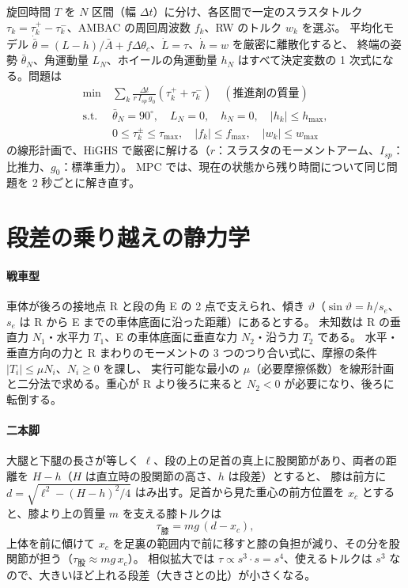 旋回時間 $T$ を $N$ 区間（幅 $\Delta t$）に分け、各区間で一定のスラスタトルク $\tau_k=\tau_k^+-\tau_k^-$、AMBAC の周回周波数 $f_k$、RW のトルク $w_k$ を選ぶ。
平均化モデル $\dot{\bar\theta} = (L-h)/\bar A + f\Delta\theta_c$、$\dot L=\tau$、$\dot h = w$ を厳密に離散化すると、
終端の姿勢 $\bar\theta_N$、角運動量 $L_N$、ホイールの角運動量 $h_N$ はすべて決定変数の 1 次式になる。問題は
\begin{align}
\min\ &\sum_k \frac{\Delta t}{r\,I_{sp}\,g_0}\left(\tau_k^++\tau_k^-\right) \quad(\text{推進剤の質量})\\
\text{s.t. }& \bar\theta_N = 90^\circ,\quad L_N=0,\quad h_N=0,\quad |h_k|\le h_{\max},\\
& 0\le\tau_k^\pm\le\tau_{\max},\quad |f_k|\le f_{\max},\quad |w_k|\le w_{\max}
\end{align}
の線形計画で、HiGHS \cite{R25} で厳密に解ける（$r$：スラスタのモーメントアーム、$I_{sp}$：比推力、$g_0$：標準重力）。
MPC では、現在の状態から残り時間について同じ問題を 2 秒ごとに解き直す。

\section{段差の乗り越えの静力学}\label{app:steps}

\paragraph{戦車型}
車体が後ろの接地点 R と段の角 E の 2 点で支えられ、傾き $\vartheta$（$\sin\vartheta = h/s_e$、$s_e$ は R から E までの車体底面に沿った距離）にあるとする。
未知数は R の垂直力 $N_1$・水平力 $T_1$、E の車体底面に垂直な力 $N_2$・沿う力 $T_2$ である。
水平・垂直方向の力と R まわりのモーメントの 3 つのつり合い式に、摩擦の条件 $|T_i|\le\mu N_i$、$N_i\ge0$ を課し、
実行可能な最小の $\mu$（必要摩擦係数）を線形計画と二分法で求める。重心が R より後ろに来ると $N_2<0$ が必要になり、後ろに転倒する。

\paragraph{二本脚}
大腿と下腿の長さが等しく $\ell$、段の上の足首の真上に股関節があり、両者の距離を $H-h$（$H$ は直立時の股関節の高さ、$h$ は段差）とすると、
膝は前方に $d = \sqrt{\ell^2-(H-h)^2/4}$ はみ出す。足首から見た重心の前方位置を $x_c$ とすると、膝より上の質量 $m$ を支える膝トルクは
\begin{equation}
\tau_{\text{膝}} = m g\,(d - x_c),
\end{equation}
上体を前に傾けて $x_c$ を足裏の範囲内で前に移すと膝の負担が減り、その分を股関節が担う（$\tau_{\text{股}}\approx m g\,x_c$）。
相似拡大では $\tau\propto s^3\cdot s = s^4$、使えるトルクは $s^3$ なので、大きいほど上れる段差（大きさとの比）が小さくなる。
